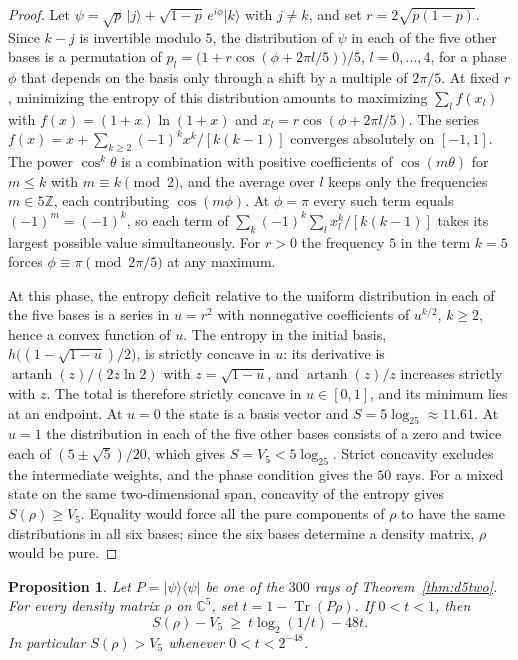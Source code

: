 \documentclass[11pt,a4paper]{article}
\newtheorem{proposition}[theorem]{Proposition}
\theoremstyle{plain}
\newenvironment{statementframe}{%
  \par\addvspace{0.55\baselineskip}\noindent
  \begingroup\setlength{\fboxrule}{0.3pt}\setlength{\fboxsep}{7pt}%
  \begin{lrbox}{\statementbox}%
  \begin{minipage}{\dimexpr\linewidth-2\fboxsep-2\fboxrule\relax}%
}{%
  \end{minipage}\end{lrbox}%
  {\color{black!45}\fbox{\color{black}\usebox{\statementbox}}}%
  \endgroup\par\addvspace{0.45\baselineskip}%
}
\DeclareMathOperator{\Tr}{Tr}
\newcommand{\C}{\mathbb C}
\newcommand{\Z}{\mathbb Z}
\newcommand{\ket}[1]{\lvert#1\rangle}
\newcommand{\bra}[1]{\langle#1\rvert}
\begin{document}
\begin{proof}
Let $\psi=\sqrt p\,\ket j+\sqrt{1-p}\,e^{i\phi}\ket k$ with $j\ne k$, and set
$r=2\sqrt{p(1-p)}$. Since $k-j$ is invertible modulo $5$, the distribution of
$\psi$ in each of the five other bases is a permutation of
$p_l=\bigl(1+r\cos(\phi+2\pi l/5)\bigr)/5$, $l=0,\dots,4$, for a phase $\phi$
that depends on the basis only through a shift by a multiple of $2\pi/5$. At
fixed $r$, minimizing the entropy of this distribution amounts to maximizing
$\sum_lf(x_l)$ with $f(x)=(1+x)\ln(1+x)$ and $x_l=r\cos(\phi+2\pi l/5)$. The
series $f(x)=x+\sum_{k\ge2}(-1)^kx^k/[k(k-1)]$ converges absolutely on
$[-1,1]$. The power $\cos^k\theta$ is a combination with positive coefficients
of $\cos(m\theta)$ for $m\le k$ with $m\equiv k\pmod 2$, and the average over
$l$ keeps only the frequencies $m\in5\Z$, each contributing $\cos(m\phi)$. At
$\phi=\pi$ every such term equals $(-1)^m=(-1)^k$, so each term of
$\sum_k(-1)^k\sum_lx_l^k/[k(k-1)]$ takes its largest possible value
simultaneously. For $r>0$ the frequency $5$ in the term $k=5$ forces
$\phi\equiv\pi\pmod{2\pi/5}$ at any maximum.

At this phase, the entropy deficit relative to the uniform distribution in
each of the five bases is a series in $u=r^2$ with nonnegative coefficients
of $u^{k/2}$, $k\ge2$, hence a convex function of $u$. The entropy in the
initial basis, $h\bigl((1-\sqrt{1-u})/2\bigr)$, is strictly concave in $u$:
its derivative is $\operatorname{artanh}(z)/(2z\ln2)$ with $z=\sqrt{1-u}$, and
$\operatorname{artanh}(z)/z$ increases strictly with $z$. The total is
therefore strictly concave in $u\in[0,1]$, and its minimum lies at an
endpoint. At $u=0$ the state is a basis vector and $S=5\log_25\approx11.61$.
At $u=1$ the distribution in each of the five other bases consists of a zero
and twice each of $(5\pm\sqrt5)/20$, which gives $S=V_5<5\log_25$. Strict
concavity excludes the intermediate weights, and the phase condition gives
the $50$ rays. For a mixed state on the same two-dimensional span, concavity
of the entropy gives $S(\rho)\ge V_5$. Equality would force all the pure
components of $\rho$ to have the same distributions in all six bases; since
the six bases determine a density matrix, $\rho$ would be pure.
\end{proof}

\begin{statementframe}
\begin{proposition}\label{prop:d5local}
Let $P=\ket\psi\bra\psi$ be one of the $300$ rays of
Theorem~\ref{thm:d5two}. For every density matrix $\rho$ on $\C^5$, set
$t=1-\Tr(P\rho)$. If $0<t<1$, then
\[
  S(\rho)-V_5\ \ge\ t\log_2(1/t)-48t .
\]
In particular $S(\rho)>V_5$ whenever $0<t<2^{-48}$.
\end{proposition}
\end{statementframe}
\end{document}
